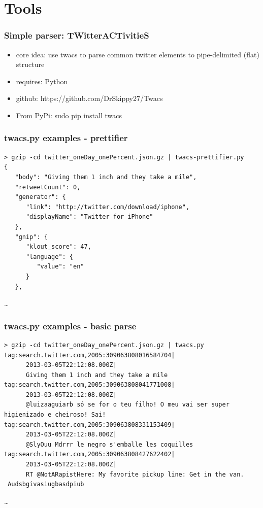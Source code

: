\documentclass{beamer}
\begin{document}
\section{Tools}
{
\begin{frame}[fragile]
\Huge{\color{black}\secname{}}
\end{frame}
}

\begin{frame}\frametitle{Simple parser: TWitterACTivitieS}
\begin{itemize}
\item core idea: use twacs to parse common twitter elements to pipe-delimited (flat) structure
\item requires: Python
\item github: https://github.com/DrSkippy27/Twacs
\item From PyPi: sudo pip install twacs 
\end{itemize}
\end{frame}

\begin{frame}[fragile]
\frametitle{twacs.py examples - prettifier}
\begin{verbatim}
> gzip -cd twitter_oneDay_onePercent.json.gz | twacs-prettifier.py 
{
   "body": "Giving them 1 inch and they take a mile", 
   "retweetCount": 0, 
   "generator": {
      "link": "http://twitter.com/download/iphone", 
      "displayName": "Twitter for iPhone"
   }, 
   "gnip": {
      "klout_score": 47, 
      "language": {
         "value": "en"
      }
   }, 
\end{verbatim}
\ldots
\end{frame}

\begin{frame}[fragile]
\frametitle{twacs.py examples - basic parse}
\begin{verbatim}
> gzip -cd twitter_oneDay_onePercent.json.gz | twacs.py 
tag:search.twitter.com,2005:309063808016584704|
      2013-03-05T22:12:08.000Z|
      Giving them 1 inch and they take a mile
tag:search.twitter.com,2005:309063808041771008|
      2013-03-05T22:12:08.000Z|
      @luizaaguiarb só se for o teu filho! O meu vai ser super higienizado e cheiroso! Sai!
tag:search.twitter.com,2005:309063808331153409|
      2013-03-05T22:12:08.000Z|
      @SlyOuu Mdrrr le negro s'emballe les coquilles
tag:search.twitter.com,2005:309063808427622402|
      2013-03-05T22:12:08.000Z|
      RT @NotARapistHere: My favorite pickup line: Get in the van.
 Audsbgivasiugbasdpiub
\end{verbatim}
\ldots
\end{frame}
\end{document}
